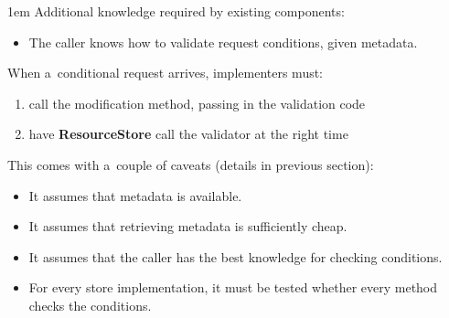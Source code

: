 \documentclass[10pt]{article}
\newenvironment{Note}
  {\begin{multicols}{3}%
     \parskip 1em}
  {\end{multicols}}
\begin{document}
\begin{Note}
Additional knowledge required by existing components:
\begin{itemize}
  \item The caller knows how to validate request conditions,
        given metadata.
\end{itemize}

\bigskip
When a~conditional request arrives, implementers must:
\begin{enumerate}
  \item call the modification method,
        passing in the validation code
  \item have \textbf{ResourceStore} call the validator
        at the right time
\end{enumerate}

\bigskip
This comes with a~couple of caveats
(details in previous section):
\begin{itemize}
  \item It assumes that metadata is available.
  \item It assumes that retrieving metadata is sufficiently cheap.
  \item It assumes that the caller has the best knowledge for checking conditions.
  \item For every store implementation,
        it must be tested whether every method checks the conditions.
\end{itemize}

\columnbreak
\null


\columnbreak
\null

\end{Note}


\clearpage
\end{document}
